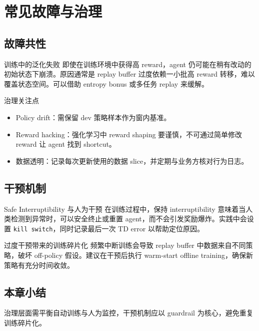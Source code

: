 \section{常见故障与治理}

\subsection{故障共性}

\begin{warningbox}{训练中的泛化失败}
即使在训练环境中获得高 reward，agent 仍可能在稍有改动的初始状态下崩溃。原因通常是 replay buffer 过度依赖一小批高 reward 转移，难以覆盖状态空间。可以借助 entropy bonus 或多任务 replay 来缓解。
\end{warningbox}

\begin{knowledgebox}{治理关注点}
\begin{itemize}
    \item Policy drift：需保留 dev 策略样本作为窗内基准。
    \item Reward hacking：强化学习中 reward shaping 要谨慎，不可通过简单修改 reward 让 agent 找到 shortcut。
    \item 数据透明：记录每次更新使用的数据 slice，并定期与业务方核对行为日志。
\end{itemize}
\end{knowledgebox}

\subsection{干预机制}

\begin{importantbox}{Safe Interruptibility 与人为干预}
在训练过程中，保持 interruptibility 意味着当人类检测到异常时，可以安全终止或重置 agent，而不会引发奖励爆炸。实践中会设置 \texttt{kill switch}，同时记录最后一次 TD error 以帮助定位原因。
\end{importantbox}

\begin{warningbox}{过度干预带来的训练碎片化}
频繁中断训练会导致 replay buffer 中数据来自不同策略，破坏 off-policy 假设。建议在干预后执行 warm-start offline training，确保新策略有充分时间收敛。
\end{warningbox}

\subsection{本章小结}

治理层面需平衡自动训练与人为监控，干预机制应以 guardrail 为核心，避免重复训练碎片化。

